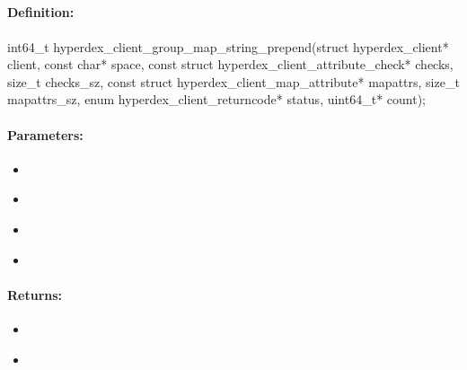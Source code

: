 \pagebreak
\subsection{}
\label{api:c:group_map_string_prepend}


\paragraph{Definition:}
\begin{ccode}
int64_t hyperdex_client_group_map_string_prepend(struct hyperdex_client* client,
        const char* space,
        const struct hyperdex_client_attribute_check* checks, size_t checks_sz,
        const struct hyperdex_client_map_attribute* mapattrs, size_t mapattrs_sz,
        enum hyperdex_client_returncode* status,
        uint64_t* count);
\end{ccode}

\paragraph{Parameters:}
\begin{itemize}[noitemsep]
\item {}\\

\item {}\\

\item {}\\

\item {}\\

\end{itemize}

\paragraph{Returns:}
\begin{itemize}[noitemsep]
\item {}\\

\item {}\\

\end{itemize}


